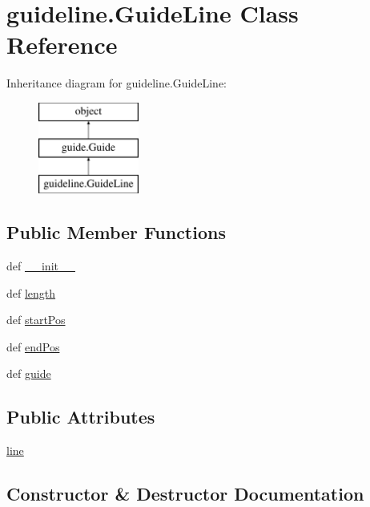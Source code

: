 \hypertarget{classguideline_1_1GuideLine}{}\section{guideline.\+Guide\+Line Class Reference}
\label{classguideline_1_1GuideLine}
Inheritance diagram for guideline.\+Guide\+Line\+:\begin{figure}[H]
\begin{center}
\leavevmode
\includegraphics[height=3.000000cm]{classguideline_1_1GuideLine}
\end{center}
\end{figure}
\subsection*{Public Member Functions}
\begin{DoxyCompactItemize}
\item 
def \hyperlink{classguideline_1_1GuideLine_ac47b16564602f1140ed087a75327b78e}{\+\_\+\+\_\+init\+\_\+\+\_\+}
\item 
def \hyperlink{classguideline_1_1GuideLine_adea4a055535650c752b2230ffe97a78e}{length}
\item 
def \hyperlink{classguideline_1_1GuideLine_a406b663ef1ae18785ae85d003a578af4}{start\+Pos}
\item 
def \hyperlink{classguideline_1_1GuideLine_aac080e92edc23a82c467e8adc58d0845}{end\+Pos}
\item 
def \hyperlink{classguideline_1_1GuideLine_a0b5066bd9dcdc5962851335f000b5ab2}{guide}
\end{DoxyCompactItemize}
\subsection*{Public Attributes}
\begin{DoxyCompactItemize}
\item 
\hyperlink{classguideline_1_1GuideLine_a2c65f372108945f64f926f9d7da20245}{line}
\end{DoxyCompactItemize}


\subsection{Constructor \& Destructor Documentation}
\hypertarget{classguideline_1_1GuideLine_ac47b16564602f1140ed087a75327b78e}{}
